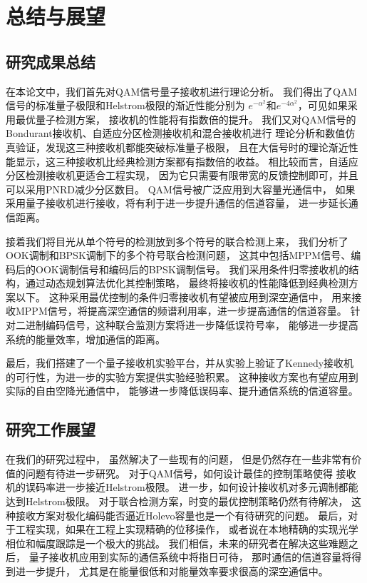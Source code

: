 \chapter{总结与展望}
\section{研究成果总结}
在本论文中，我们首先对QAM信号量子接收机进行理论分析。
我们得出了QAM信号的标准量子极限和Helstrom极限的渐近性能分别为
$e^{-\alpha^2}$和$e^{-4\alpha^2}$，可见如果采用最优量子检测方案，
接收机的性能将有指数倍的提升。
我们又对QAM信号的Bondurant接收机、自适应分区检测接收机和混合接收机进行
理论分析和数值仿真验证，发现这三种接收机都能突破标准量子极限，
且在大信号时的理论渐近性能显示，这三种接收机比经典检测方案都有指数倍的收益。
相比较而言，自适应分区检测接收机更适合工程实现，
因为它只需要有限带宽的反馈控制即可，并且可以采用PNRD减少分区数目。
QAM信号被广泛应用到大容量光通信中，
如果采用量子接收机进行接收，将有利于进一步提升通信的信道容量，
进一步延长通信距离。

接着我们将目光从单个符号的检测放到多个符号的联合检测上来，
我们分析了OOK调制和BPSK调制下的多个符号联合检测问题，
这其中包括MPPM信号、编码后的OOK调制信号和编码后的BPSK调制信号。
我们采用条件归零接收机的结构，通过动态规划算法优化其控制策略，
最终将接收机的性能降低到经典检测方案以下。
这种采用最优控制的条件归零接收机有望被应用到深空通信中，
用来接收MPPM信号，将提高深空通信的频谱利用率，进一步提高通信的信道容量。
针对二进制编码信号，这种联合监测方案将进一步降低误符号率，
能够进一步提高系统的能量效率，增加通信的距离。

最后，我们搭建了一个量子接收机实验平台，并从实验上验证了Kennedy接收机
的可行性，为进一步的实验方案提供实验经验积累。
这种接收方案也有望应用到实际的自由空降光通信中，
能够进一步降低误码率、提升通信系统的信道容量。

\section{研究工作展望}
在我们的研究过程中，
虽然解决了一些现有的问题，
但是仍然存在一些非常有价值的问题有待进一步研究。
对于QAM信号，如何设计最佳的控制策略使得
接收机的误码率进一步接近Helstrom极限。
进一步，如何设计接收机对多元调制都能达到Helstrom极限。
对于联合检测方案，时变的最优控制策略仍然有待解决，
这种接收方案对极化编码能否逼近Holevo容量也是一个有待研究的问题。
最后，对于工程实现，如果在工程上实现精确的位移操作，
或者说在本地精确的实现光学相位和幅度跟踪是一个极大的挑战。
我们相信，未来的研究者在解决这些难题之后，
量子接收机应用到实际的通信系统中将指日可待，
那时通信的信道容量将得到进一步提升，
尤其是在能量很低和对能量效率要求很高的深空通信中。


